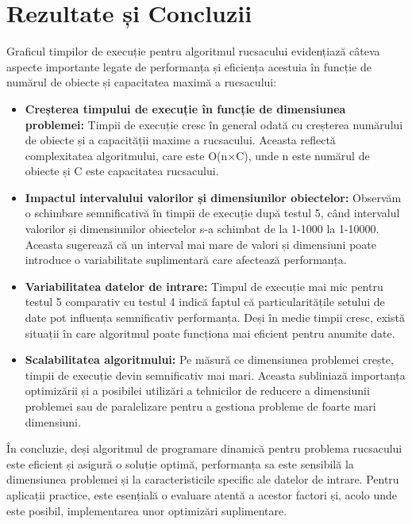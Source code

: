 \documentclass[a4paper,12pt]{article}
\begin{document}
\section{Rezultate și Concluzii}
Graficul timpilor de execuție pentru algoritmul rucsacului evidențiază câteva aspecte importante legate de performanța și eficiența acestuia în funcție de numărul de obiecte și capacitatea maximă a rucsacului:

\begin{itemize}
\item \textbf{Creșterea timpului de execuție în funcție de dimensiunea problemei:} Timpii de execuție cresc în general odată cu creșterea numărului de obiecte și a capacității maxime a rucsacului. Aceasta reflectă complexitatea algoritmului, care este O(n×C), unde n este numărul de obiecte și C este capacitatea rucsacului.
\item \textbf{Impactul intervalului valorilor și dimensiunilor obiectelor:} Observăm o schimbare semnificativă în timpii de execuție după testul 5, când intervalul valorilor și dimensiunilor obiectelor s-a schimbat de la 1-1000 la 1-10000. Aceasta sugerează că un interval mai mare de valori și dimensiuni poate introduce o variabilitate suplimentară care afectează performanța.
\item \textbf{Variabilitatea datelor de intrare:} Timpul de execuție mai mic pentru testul 5 comparativ cu testul 4 indică faptul că particularitățile setului de date pot influența semnificativ performanța. Deși în medie timpii cresc, există situații în care algoritmul poate funcționa mai eficient pentru anumite date.
\item \textbf{Scalabilitatea algoritmului:} Pe măsură ce dimensiunea problemei crește, timpii de execuție devin semnificativ mai mari. Aceasta subliniază importanța optimizării și a posibilei utilizări a tehnicilor de reducere a dimensiunii problemei sau de paralelizare pentru a gestiona probleme de foarte mari dimensiuni.
\end{itemize}

În concluzie, deși algoritmul de programare dinamică pentru problema rucsacului este eficient și asigură o soluție optimă, performanța sa este sensibilă la dimensiunea problemei și la caracteristicile specific ale datelor de intrare. Pentru aplicații practice, este esențială o evaluare atentă a acestor factori și, acolo unde este posibil, implementarea unor optimizări suplimentare.
\end{document}
